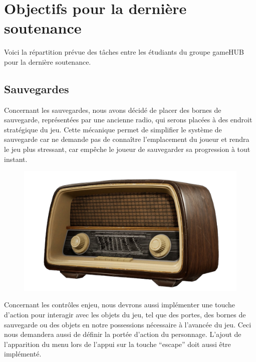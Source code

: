 \section{Objectifs pour la dernière soutenance}
\noindent Voici la répartition prévue des tâches entre les étudiants du groupe gameHUB pour la dernière soutenance.

\subsection{Sauvegardes}
\setlength{\parindent}{5ex}
Concernant les sauvegardes, nous avons décidé de placer des bornes de sauvegarde, représentées par une ancienne radio, qui serons placées à des endroit stratégique du jeu. Cette mécanique permet de simplifier le système de sauvegarde car ne demande pas de connaître l’emplacement du joueur et rendra le jeu plus stressant, car empêche le joueur de sauvegarder sa progression à tout instant.
\begin{figure}[H]
\centering
\begin{minipage}{.5\textwidth}
  \centering
  \centerline{\includegraphics[width=1.5\linewidth]{img/assets/save.png}}
  \label{fig:save}
\end{minipage}%
\end{figure}


Concernant les contrôles enjeu, nous devrons aussi implémenter une touche d’action pour interagir avec les objets du jeu, tel que des portes, des bornes de sauvegarde ou des objets en notre possessions nécessaire à l’avancée du jeu. Ceci nous demandera aussi de définir la portée d’action du personnage.
L'ajout de l'apparition du menu lors de l'appui sur la touche ``escape'' doit aussi être implémenté.
\newline

